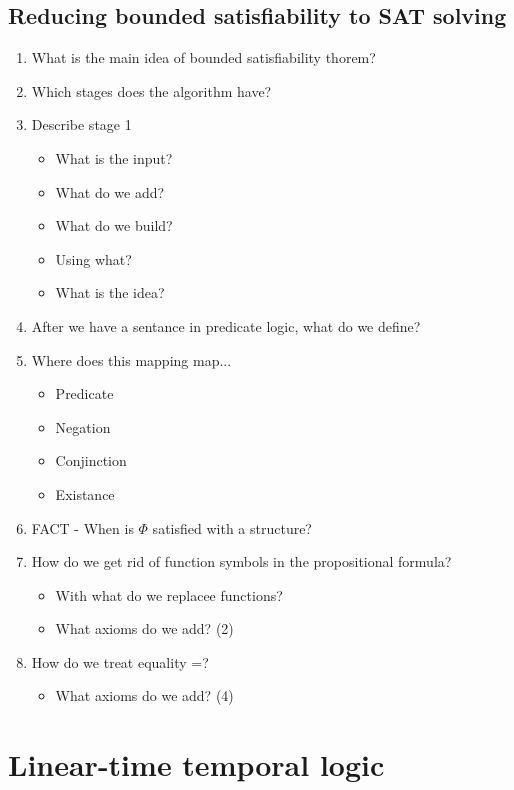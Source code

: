 \documentclass[fleqn]{article}
\begin{document}
\subsection{Reducing bounded satisfiability to SAT solving}
\begin{enumerate}
    \item What is the main idea of bounded satisfiability thorem?
    \item Which stages does the algorithm have?
    \item Describe stage 1
    \begin{itemize}
        \item What is the input?
        \item What do we add?
        \item What do we build?
        \item Using what?
        \item What is the idea?
    \end{itemize}
    \item After we have a sentance in predicate logic, what do we define?
    \item Where does this mapping map...
    \begin{itemize}
        \item Predicate
        \item Negation
        \item Conjinction
        \item Existance
    \end{itemize}
    \item FACT - When is $\Phi$ satisfied with a structure?
    \item How do we get rid of function symbols in the propositional formula?
    \begin{itemize}
        \item With what do we replacee functions?
        \item What axioms do we add? (2)
    \end{itemize}
    \item How do we treat equality =?
    \begin{itemize}
        \item What axioms do we add? (4)
    \end{itemize}
\end{enumerate}


\section{Linear-time temporal logic}
\end{document}

